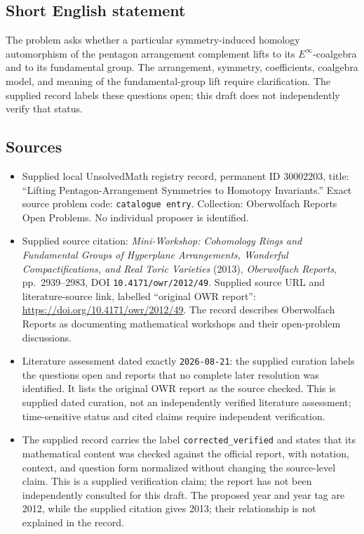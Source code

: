 \documentclass[11pt]{article}
\begin{document}
\subsection{Short English statement}
The problem asks whether a particular symmetry-induced homology automorphism of the pentagon arrangement complement lifts to its \(E^{\infty}\)-coalgebra and to its fundamental group. The arrangement, symmetry, coefficients, coalgebra model, and meaning of the fundamental-group lift require clarification. The supplied record labels these questions open; this draft does not independently verify that status.
\subsection{Sources}
\begin{itemize}
\item Supplied local UnsolvedMath registry record, permanent ID \(30002203\), title: ``Lifting Pentagon-Arrangement Symmetries to Homotopy Invariants.'' Exact source problem code: \texttt{catalogue entry}. Collection: Oberwolfach Reports Open Problems. No individual proposer is identified.
\item Supplied source citation: \emph{Mini-Workshop: Cohomology Rings and Fundamental Groups of Hyperplane Arrangements, Wonderful Compactifications, and Real Toric Varieties} (2013), \emph{Oberwolfach Reports}, pp.\ 2939--2983, DOI \texttt{10.4171/owr/2012/49}. Supplied source URL and literature-source link, labelled ``original OWR report'': \url{https://doi.org/10.4171/owr/2012/49}. The record describes Oberwolfach Reports as documenting mathematical workshops and their open-problem discussions.
\item Literature assessment dated exactly \texttt{2026-08-21}: the supplied curation labels the questions open and reports that no complete later resolution was identified. It lists the original OWR report as the source checked. This is supplied dated curation, not an independently verified literature assessment; time-sensitive status and cited claims require independent verification.
\item The supplied record carries the label \texttt{corrected\_verified} and states that its mathematical content was checked against the official report, with notation, context, and question form normalized without changing the source-level claim. This is a supplied verification claim; the report has not been independently consulted for this draft. The proposed year and year tag are 2012, while the supplied citation gives 2013; their relationship is not explained in the record.
\end{itemize}
\end{document}
